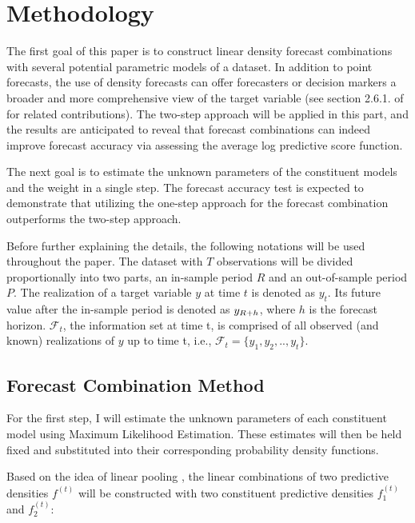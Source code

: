 \documentclass{monashthesis}
\begin{document}
\hypertarget{methodology}{%
\chapter{Methodology}\label{methodology}}

The first goal of this paper is to construct linear density forecast combinations with several potential parametric models of a dataset. In addition to point forecasts, the use of density forecasts can offer forecasters or decision markers a broader and more comprehensive view of the target variable (see section 2.6.1. of \textcite{FTP22} for related contributions). The two-step approach will be applied in this part, and the results are anticipated to reveal that forecast combinations can indeed improve forecast accuracy via assessing the average log predictive score function.

The next goal is to estimate the unknown parameters of the constituent models and the weight in a single step. The forecast accuracy test is expected to demonstrate that utilizing the one-step approach for the forecast combination outperforms the two-step approach.

Before further explaining the details, the following notations will be used throughout the paper. The dataset with \(T\) observations will be divided proportionally into two parts, an in-sample period \(R\) and an out-of-sample period \(P\). The realization of a target variable \(y\) at time \(t\) is denoted as \(y_{t}\). Its future value after the in-sample period is denoted as \(y_{\small{R+h}}\), where \(h\) is the forecast horizon. \(\mathcal{F}_t\), the information set at time t, is comprised of all observed (and known) realizations of \(y\) up to time t, i.e., \(\mathcal{F}_t = \{y_1, y_2, .., y_t\}\).

\hypertarget{forecast-combination-method}{%
\section{Forecast Combination Method}\label{forecast-combination-method}}

For the first step, I will estimate the unknown parameters of each constituent model using Maximum Likelihood Estimation. These estimates will then be held fixed and substituted into their corresponding probability density functions.

Based on the idea of linear pooling \autocite{BG69,HM07,GA11}, the linear combinations of two predictive densities \(f^{(t)}\) will be constructed with two constituent predictive densities \(f^{(t)}_1\) and \(f^{(t)}_2\):
\end{document}
